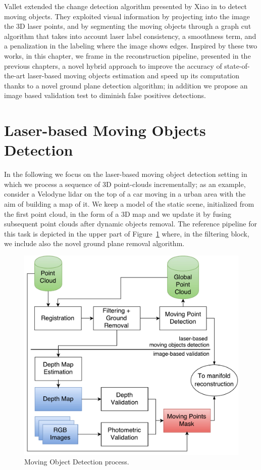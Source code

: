 Vallet \etal \cite{vallet2015extracting} extended the change detection algorithm presented by Xiao \etal in \cite{xiao2013change} to detect moving objects. They exploited visual information by projecting into the image the 3D laser points, and by segmenting the moving objects through a graph cut algorithm that takes into account laser label consistency, a smoothness term, and a penalization in the labeling where the image shows edges. 
Inspired by these two works, in this chapter, we frame in the reconstruction  pipeline, presented in the previous chapters, a novel hybrid approach to improve the accuracy of state-of-the-art laser-based moving objects estimation and speed up its computation thanks to a novel ground plane detection algorithm; in addition we propose an image based validation test to diminish false positives detections. 



\section{Laser-based Moving Objects Detection}%
\label{sec:lidar}
In the following we focus on the laser-based moving object detection setting in which we process a sequence of 3D point-clouds incrementally; as an example, consider a Velodyne lidar on the top of a car moving in a urban area with the aim of building a map of it. 
We keep a model of the static scene, initialized from the first point cloud, in the form of a 3D map and we update it by fusing subsequent point clouds after dynamic objects removal. 
The reference pipeline for this task is depicted in the upper part of Figure~\ref{fig:algo} where, in the filtering block, we include also the novel ground plane removal algorithm.

\begin{figure}[t]
\centering
\includegraphics[width=0.98\columnwidth]{./img/ch-laser/MovingPointDetection}
\caption{Moving Object Detection process.}
\label{fig:algo}
\end{figure}
%
